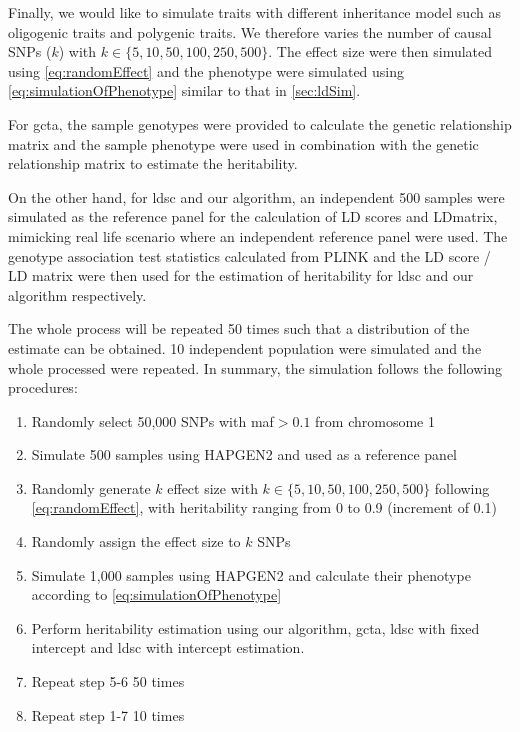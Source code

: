 			Finally, we would like to simulate traits with different inheritance model such as oligogenic traits and polygenic traits.
			We therefore varies the number of causal \glspl{SNP} ($k$) with $k\in\{5, 10, 50, 100, 250, 500\}$.
			The effect size were then simulated using \cref{eq:randomEffect} and the phenotype were simulated using \cref{eq:simulationOfPhenotype} similar to that in \cref{sec:ldSim}.
			
			For \gls{gcta}, the sample genotypes were provided to calculate the genetic relationship matrix and the sample phenotype were used in combination with the genetic relationship matrix to estimate the heritability.
			
			On the other hand, for \gls{ldsc} and our algorithm, an independent 500 samples were simulated as the reference panel for the calculation of \gls{LD} scores and \gls{LD}matrix, mimicking real life scenario where an independent reference panel were used. 
			The genotype association test statistics calculated from PLINK and the \gls{LD} score / \gls{LD} matrix were then used for the estimation of heritability for \gls{ldsc} and our algorithm respectively. 
			
			The whole process will be repeated 50 times such that a distribution of the estimate can be obtained.
			10 independent population were simulated and the whole processed were repeated.
			In summary, the simulation follows the following procedures:
			\begin{enumerate}
				\item Randomly select 50,000 \glspl{SNP} with \gls{maf}$>0.1$ from chromosome 1
				\item Simulate 500 samples using HAPGEN2 and used as a reference panel
				\item Randomly generate $k$ effect size with $k \in \{5,10,50,100,250,500\}$ following \cref{eq:randomEffect}, with heritability ranging from 0 to 0.9 (increment of 0.1)
				\item Randomly assign the effect size to $k$ \glspl{SNP}
				\item Simulate 1,000 samples using HAPGEN2 and calculate their phenotype according to \cref{eq:simulationOfPhenotype}
				\item Perform heritability estimation using our algorithm, \gls{gcta}, \gls{ldsc} with fixed intercept and \gls{ldsc} with intercept estimation.
				\item Repeat step 5-6 50 times
				\item Repeat step 1-7 10 times
			\end{enumerate}
		
